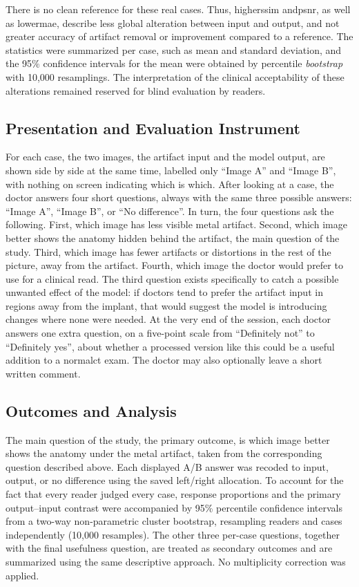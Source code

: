 There is no clean reference for these real cases. Thus, higher\acrshort{ssim} and\acrshort{psnr}, as well as lower\acrshort{mae}, describe less global alteration between input and output, and not greater accuracy of artifact removal or improvement compared to a reference. The statistics were summarized per case, such as mean and standard deviation, and the 95\% confidence intervals for the mean were obtained by percentile \textit{bootstrap} with 10,000 resamplings. The interpretation of the clinical acceptability of these alterations remained reserved for blind evaluation by readers.

\subsection{Presentation and Evaluation Instrument}

For each case, the two images, the artifact input and the model output, are shown side by side at the same time, labelled only ``Image A'' and ``Image B'', with nothing on screen indicating which is which. After looking at a case, the doctor answers four short questions, always with the same three possible answers: ``Image A'', ``Image B'', or ``No difference''. In turn, the four questions ask the following. First, which image has less visible metal artifact. Second, which image better shows the anatomy hidden behind the artifact, the main question of the study. Third, which image has fewer artifacts or distortions in the rest of the picture, away from the artifact. Fourth, which image the doctor would prefer to use for a clinical read. The third question exists specifically to catch a possible unwanted effect of the model: if doctors tend to prefer the artifact input in regions away from the implant, that would suggest the model is introducing changes where none were needed. At the very end of the session, each doctor answers one extra question, on a five-point scale from ``Definitely not'' to ``Definitely yes'', about whether a processed version like this could be a useful addition to a normal\acrshort{ct} exam. The doctor may also optionally leave a short written comment.

\subsection{Outcomes and Analysis}

The main question of the study, the primary outcome, is which image better shows the anatomy under the metal artifact, taken from the corresponding question described above. Each displayed A/B answer was recoded to input, output, or no difference using the saved left/right allocation. To account for the fact that every reader judged every case, response proportions and the primary output--input contrast were accompanied by 95\% percentile confidence intervals from a two-way non-parametric cluster bootstrap, resampling readers and cases independently (10,000 resamples). The other three per-case questions, together with the final usefulness question, are treated as secondary outcomes and are summarized using the same descriptive approach. No multiplicity correction was applied.

